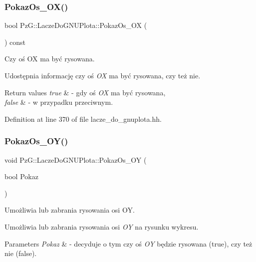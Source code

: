 \subsubsection{\texorpdfstring{Pokaz\+Os\+\_\+\+O\+X()}{PokazOs\_OX()}\hspace{0.1cm}{\footnotesize\ttfamily [2/2]}}
{\footnotesize\ttfamily bool Pz\+G\+::\+Lacze\+Do\+G\+N\+U\+Plota\+::\+Pokaz\+Os\+\_\+\+OX (\begin{DoxyParamCaption}{ }\end{DoxyParamCaption}) const\hspace{0.3cm}{\ttfamily [inline]}}



Czy oś OX ma być rysowana. 

Udostępnia informację czy oś {\itshape OX} ma być rysowana, czy też nie. 
\begin{DoxyRetVals}{Return values}
{\em true} & -\/ gdy oś {\itshape OX} ma być rysowana, \\
\hline
{\em false} & -\/ w przypadku przeciwnym. \\
\hline
\end{DoxyRetVals}


Definition at line 370 of file lacze\+\_\+do\+\_\+gnuplota.\+hh.

\mbox{\label{class_pz_g_1_1_lacze_do_g_n_u_plota_a7c3db909b266fc30808e86406c04b516}} 
\subsubsection{\texorpdfstring{Pokaz\+Os\+\_\+\+O\+Y()}{PokazOs\_OY()}\hspace{0.1cm}{\footnotesize\ttfamily [1/2]}}
{\footnotesize\ttfamily void Pz\+G\+::\+Lacze\+Do\+G\+N\+U\+Plota\+::\+Pokaz\+Os\+\_\+\+OY (\begin{DoxyParamCaption}\item[{bool}]{Pokaz }\end{DoxyParamCaption})\hspace{0.3cm}{\ttfamily [inline]}}



Umożliwia lub zabrania rysowania osi OY. 

Umożliwia lub zabrania rysowania osi {\itshape OY} na rysunku wykresu. 
\begin{DoxyParams}{Parameters}
{\em Pokaz} & -\/ decyduje o tym czy oś {\itshape OY} będzie rysowana ({\ttfamily true}), czy też nie ({\ttfamily false}). \\
\hline
\end{DoxyParams}


